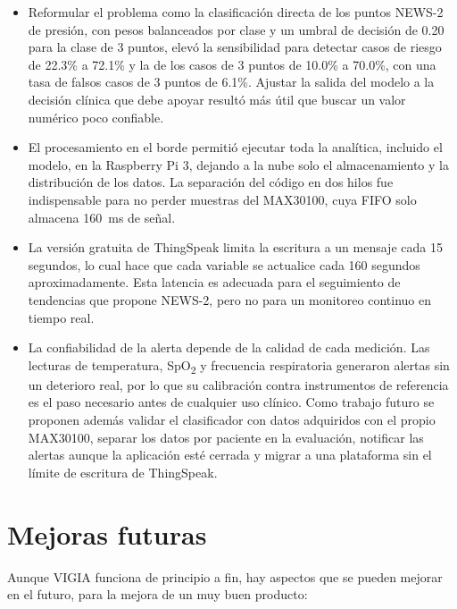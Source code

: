 \documentclass[11pt,a4paper]{article}
\begin{document}
\begin{itemize}
    \item Reformular el problema como la clasificación directa de los puntos NEWS-2 de presión, con pesos balanceados por clase y un umbral de decisión de 0.20 para la clase de 3 puntos, elevó la sensibilidad para detectar casos de riesgo de 22.3\% a 72.1\% y la de los casos de 3 puntos de 10.0\% a 70.0\%, con una tasa de falsos casos de 3 puntos de 6.1\%. Ajustar la salida del modelo a la decisión clínica que debe apoyar resultó más útil que buscar un valor numérico poco confiable.

    \item El procesamiento en el borde permitió ejecutar toda la analítica, incluido el modelo, en la Raspberry Pi 3, dejando a la nube solo el almacenamiento y la distribución de los datos. La separación del código en dos hilos fue indispensable para no perder muestras del MAX30100, cuya FIFO solo almacena 160~ms de señal.

    \item La versión gratuita de ThingSpeak limita la escritura a un mensaje cada 15 segundos, lo cual hace que cada variable se actualice cada 160 segundos aproximadamente. Esta latencia es adecuada para el seguimiento de tendencias que propone NEWS-2, pero no para un monitoreo continuo en tiempo real.

    \item La confiabilidad de la alerta depende de la calidad de cada medición. Las lecturas de temperatura, SpO\textsubscript{2} y frecuencia respiratoria generaron alertas sin un deterioro real, por lo que su calibración contra instrumentos de referencia es el paso necesario antes de cualquier uso clínico. Como trabajo futuro se proponen además validar el clasificador con datos adquiridos con el propio MAX30100, separar los datos por paciente en la evaluación, notificar las alertas aunque la aplicación esté cerrada y migrar a una plataforma sin el límite de escritura de ThingSpeak.
\end{itemize}



\section{Mejoras futuras}\label{sec:mejoras}

Aunque VIGIA funciona de principio a fin, hay aspectos que se pueden mejorar en el futuro, para la mejora de un muy buen producto:
\end{document}
